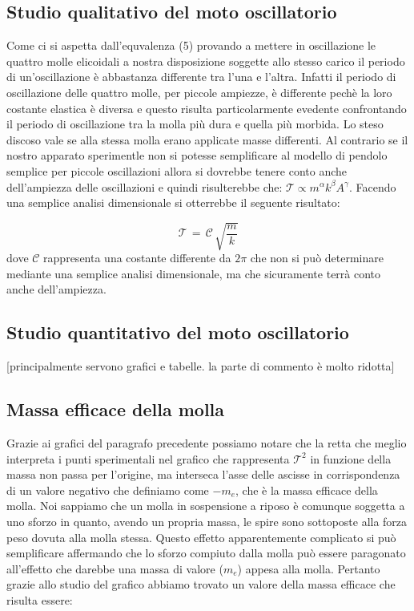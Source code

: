 \subsection{Studio qualitativo del moto oscillatorio}
Come ci si aspetta dall'equvalenza (5) provando a mettere in oscillazione le quattro molle elicoidali a nostra disposizione soggette allo stesso carico il periodo di un'oscillazione è abbastanza differente tra l'una e l'altra. Infatti il periodo di oscillazione delle quattro molle, per piccole ampiezze, è differente pechè la loro costante elastica è diversa e questo risulta particolarmente evedente confrontando il periodo di oscillazione tra la molla più dura e quella più morbida. Lo steso discoso vale se alla stessa molla erano applicate masse differenti.
Al contrario se il nostro apparato sperimentle non si potesse semplificare al modello di pendolo semplice per piccole oscillazioni allora si dovrebbe tenere conto anche dell'ampiezza delle oscillazioni e quindi risulterebbe che: $\mathcal{T} \propto m^\alpha k^\beta A^\gamma$. Facendo una semplice analisi dimensionale si otterrebbe il seguente risultato:

\begin{equation*}
	\mathcal{T} \,=\, \mathcal{C} \, \sqrt{\frac{m}{k}}
\end{equation*}
%
dove $\mathcal{C}$ rappresenta una costante differente da $2 \pi$ che non si può determinare mediante una semplice analisi dimensionale, ma che sicuramente terrà conto anche dell'ampiezza.

\subsection{Studio quantitativo del moto oscillatorio}
[principalmente servono grafici e tabelle. la parte di commento è molto ridotta]
\subsection{Massa efficace della molla}
Grazie ai grafici del paragrafo precedente possiamo notare che la retta che meglio interpreta i punti sperimentali nel grafico che rappresenta $\mathcal{T}^2$ in funzione della massa non passa per l'origine, ma interseca l'asse delle ascisse in corrispondenza di un valore negativo che definiamo come $- m_e$, che è la massa efficace della molla.
Noi sappiamo che un molla in sospensione a riposo è comunque soggetta a uno sforzo in quanto, avendo un propria massa, le spire sono sottoposte alla forza peso dovuta alla molla stessa. Questo effetto apparentemente complicato si può semplificare affermando che lo sforzo compiuto dalla molla può essere paragonato all'effetto che darebbe una massa di valore ($m_e$) appesa alla molla. Pertanto grazie allo studio del grafico abbiamo trovato un valore della massa efficace che risulta essere:

